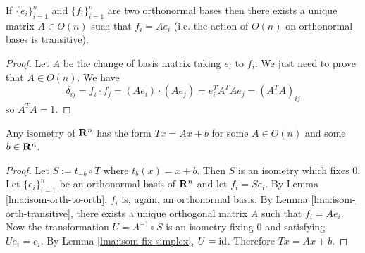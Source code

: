 \documentclass[12pt]{article}
\begin{document}
\begin{lma}\label{lma:isom-orth-transitive}
If $\{e_i\}_{i=1}^n$ and $\{f_i\}_{i=1}^n$ are two orthonormal bases then there exists a unique matrix $A\in O(n)$ such that $f_i=Ae_i$ (i.e. the action of $O(n)$ on orthonormal bases is transitive).
\end{lma}
\begin{proof}
  Let $A$ be the change of basis matrix taking $e_i$ to $f_i$. We just need to prove that $A\in O(n)$. We have
  \[\delta_{ij}=f_i\cdot f_j=(Ae_i)\cdot (Ae_j)=e_i^TA^TAe_j=(A^TA)_{ij}\]
  so $A^TA=1$.
\end{proof}

\begin{cor}
Any isometry of $\mathbf{R}^n$ has the form $Tx=Ax+b$ for some $A\in O(n)$ and some $b\in\mathbf{R}^n$.
\end{cor}
\begin{proof}
Let $S:=t_{-b}\circ T$ where $t_b(x)=x+b$. Then $S$ is an isometry which fixes $0$. Let $\{e_i\}_{i=1}^n$ be an orthonormal basis of $\mathbf{R}^n$ and let $f_i=Se_i$. By Lemma \ref{lma:isom-orth-to-orth}, $f_i$ is, again, an orthonormal basis. By Lemma \ref{lma:isom-orth-transitive}, there exists a unique orthogonal matrix $A$ such that $f_i=Ae_i$. Now the transformation $U=A^{-1}\circ S$ is an isometry fixing $0$ and satisfying $Ue_i=e_i$. By Lemma \ref{lma:isom-fix-simplex}, $U=\operatorname{id}$. Therefore $Tx=Ax+b$.
\end{proof}
\end{document}

